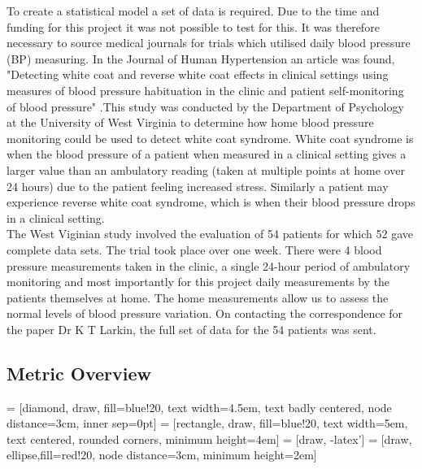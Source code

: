 \documentclass[11pt]{article}
\begin{document}
To create a statistical model a set of data is required. Due to the time and funding for this project it was not possible to test for this. It was therefore necessary to source medical journals for trials which utilised daily blood pressure (BP) measuring. In the Journal of Human Hypertension an article was found, "Detecting white coat and reverse white coat effects in clinical settings using measures of blood pressure habituation in the clinic and patient self-monitoring of blood pressure" \cite{study} .This study was conducted by the Department of Psychology at the University of West Virginia to determine how home blood pressure monitoring could be used to detect white coat syndrome. White coat syndrome is when the blood pressure of a patient when measured in a clinical setting gives a larger value than an ambulatory reading (taken at multiple points at home over 24 hours) due to the patient feeling increased stress. Similarly a patient may experience reverse white coat syndrome, which is when their blood pressure drops in a clinical setting. 
\\ \indent
The West Viginian study involved the evaluation of 54 patients for which 52 gave complete data sets. The trial took place over one week. There were 4 blood pressure measurements taken in the clinic, a single 24-hour period of ambulatory monitoring and most importantly for this project daily measurements by the patients themselves at home. The home measurements allow us to assess the normal levels of blood pressure variation. On contacting the correspondence for the paper Dr K T Larkin, the full set of data for the 54 patients was sent. 

\subsection{Metric Overview}

 = [diamond, draw, fill=blue!20, 
text width=4.5em, text badly centered, node distance=3cm, inner sep=0pt]
 = [rectangle, draw, fill=blue!20, 
text width=5em, text centered, rounded corners, minimum height=4em]
 = [draw, -latex']
 = [draw, ellipse,fill=red!20, node distance=3cm,
minimum height=2em]
\end{document}
